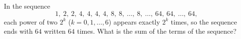 In the sequence
\[1,\ 2,\ 2,\ 4,\ 4,\ 4,\ 4,\ 8,\ 8,\ \dots,\ 8,\ \dots,\ 64,\ 64,\ \dots,\ 64,\]
each power of two $2^k$ ($k=0,1,\dots,6$) appears exactly $2^k$ times, so the sequence ends with $64$ written $64$ times. What is the sum of the terms of the sequence?
